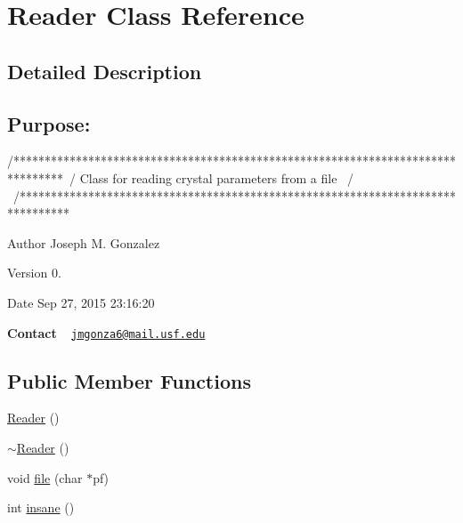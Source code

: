 \hypertarget{class_reader}{}\section{Reader Class Reference}
\label{class_reader}


\subsection{Detailed Description}
\subsection*{{\bfseries Purpose\+:} }

\begin{DoxyVerb}/********************************************************************************\
/  Class for reading crystal parameters from a file                              \
/                                                                                \
/********************************************************************************\
\end{DoxyVerb}


\begin{DoxyAuthor}{Author}
Joseph M. Gonzalez
\end{DoxyAuthor}
\begin{DoxyVersion}{Version}
0.\+1
\end{DoxyVersion}
\begin{DoxyDate}{Date}
Sep 27, 2015 23\+:16\+:20
\end{DoxyDate}
{\bfseries Contact} ~\newline
 \href{mailto:jmgonza6@mail.usf.edu}{\tt jmgonza6@mail.\+usf.\+edu} \subsection*{Public Member Functions}
\begin{DoxyCompactItemize}
\item 
\hyperlink{class_reader_adcda31b507720ab44044d7a21686fba2}{Reader} ()
\item 
\hyperlink{class_reader_a78089542fd27a0ac2df6702fffe8725c}{$\sim$\+Reader} ()
\item 
void \hyperlink{class_reader_afae5e105c093f58c13a558bc92fc7618}{file} (char $\ast$pf)
\item 
int \hyperlink{class_reader_a1967f81a208b23983d13ff8c72d453ca}{insane} ()
\end{DoxyCompactItemize}
